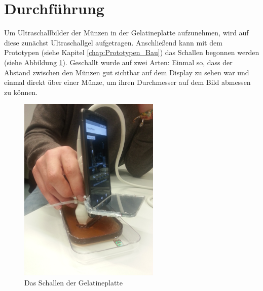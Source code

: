 \section{Durchführung}
Um Ultraschallbilder der Münzen in der Gelatineplatte aufzunehmen, wird auf diese zunächst Ultraschallgel aufgetragen. Anschließend kann mit dem Prototypen (siehe Kapitel \ref{chap:Prototypen_Bau}) das Schallen begonnen werden (siehe Abbildung \ref{fig:schallen}). Geschallt wurde auf zwei Arten: Einmal so, dass der Abstand zwischen den Münzen gut sichtbar auf dem Display zu sehen war und einmal direkt über einer Münze, um ihren Durchmesser auf dem Bild abmessen zu können.
\clearpage
\begin{figure}[h]
	\centering
	\includegraphics[width=0.6\textwidth]{Bilder/Evaluation/Schallen.jpg}
	\caption{Das Schallen der Gelatineplatte}
	\label{fig:schallen}
\end{figure}

